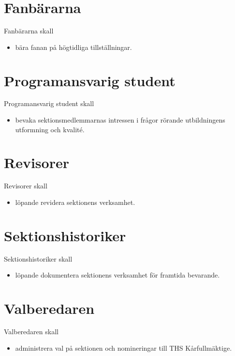 \documentclass{dgovdoc}
\begin{document}
\section{Fanbärarna}

Fanbärarna skall

\begin{itemize}
\item bära fanan på högtidliga tillställningar.
\end{itemize}

\section{Programansvarig student}

Programansvarig student skall

\begin{itemize}
\item bevaka sektionsmedlemmarnas intressen i frågor rörande utbildningens
    utformning och kvalité.
\end{itemize}

\section{Revisorer}

Revisorer skall

\begin{itemize}
\item löpande revidera sektionens verksamhet.
\end{itemize}

\section{Sektionshistoriker}

Sektionshistoriker skall

\begin{itemize}
\item löpande dokumentera sektionens verksamhet för framtida bevarande.
\end{itemize}

\section{Valberedaren}

Valberedaren skall

\begin{itemize}
\item administrera val på sektionen och nomineringar till THS Kårfullmäktige.
\end{itemize}
\end{document}
